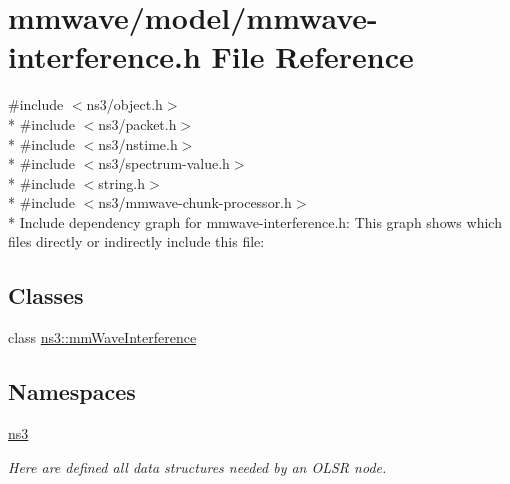 \hypertarget{mmwave-interference_8h}{}\section{mmwave/model/mmwave-\/interference.h File Reference}
\label{mmwave-interference_8h}
{\ttfamily \#include $<$ns3/object.\+h$>$}\\*
{\ttfamily \#include $<$ns3/packet.\+h$>$}\\*
{\ttfamily \#include $<$ns3/nstime.\+h$>$}\\*
{\ttfamily \#include $<$ns3/spectrum-\/value.\+h$>$}\\*
{\ttfamily \#include $<$string.\+h$>$}\\*
{\ttfamily \#include $<$ns3/mmwave-\/chunk-\/processor.\+h$>$}\\*
Include dependency graph for mmwave-\/interference.h\+:
This graph shows which files directly or indirectly include this file\+:
\subsection*{Classes}
\begin{DoxyCompactItemize}
\item 
class \hyperlink{classns3_1_1mmWaveInterference}{ns3\+::mm\+Wave\+Interference}
\end{DoxyCompactItemize}
\subsection*{Namespaces}
\begin{DoxyCompactItemize}
\item 
 \hyperlink{namespacens3}{ns3}
\begin{DoxyCompactList}\small\item\em Here are defined all data structures needed by an O\+L\+SR node. \end{DoxyCompactList}\end{DoxyCompactItemize}
